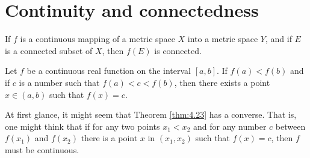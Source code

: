 
\section{Continuity and connectedness}
\begin{thm}
    \label{thm:4.22}
    If $f$ is a continuous mapping of a metric space $X$ into a metric space $Y$, 
    and if $E$ is a connected subset of $X$, then $f(E)$ is connected.
\end{thm}

\begin{thm}
    \label{thm:4.23}
    Let $f$ be a continuous real function on the interval $[a, b]$. 
    If $f(a) <f(b)$ and if $c$ is a number such that $f(a) < c < f(b)$, 
    then there exists a point $x \in (a, b)$ such that $f(x) = c$.
\end{thm}

\begin{myRemark}
    \label{myRemark:4.24}
    At first glance, it might seem that Theorem \ref{thm:4.23} has a converse.
    That is, one might think that if for any two points $x_1 < x_2$ 
    and for any number $c$ between $f(x_1)$ and $f(x_2)$ 
    there is a point $x$ in $(x_1 , x_2)$ such that $f(x) = c$, 
    then $f$ must be continuous.
\end{myRemark}